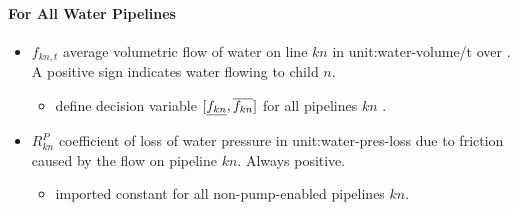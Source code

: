 \paragraph{For All Water Pipelines}
\begin{itemize}

\item $f_{kn,t}$ average volumetric flow of water on line $kn$ in
  \gls{unit:water-volume/t} over \intervaloft{}. A positive sign indicates water
  flowing to child $n$.
  \begin{itemize}
  \item \gls{define} decision variable $[\underline{f_{kn}}, \overline{f_{kn}}]$ for all
    pipelines $kn$ \atallt{}.
  \end{itemize}

\item $R^P_{kn}$ coefficient of loss of water pressure in
  \gls{unit:water-pres-loss} due to friction caused by the flow on pipeline
  $kn$. Always positive.

  \begin{itemize}
  \item \gls{imported} constant for all non-pump-enabled pipelines $kn$.
  \end{itemize}

\end{itemize}


